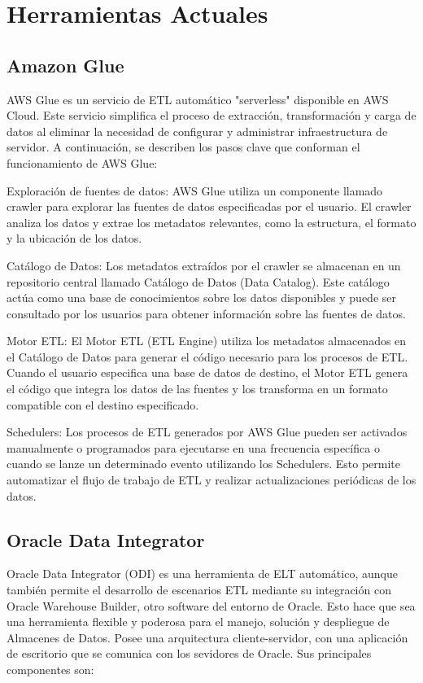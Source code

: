 \section{Herramientas Actuales} \label{section:actual_tools}

\subsection{Amazon Glue}

AWS Glue es un servicio de ETL automático "serverless" disponible en AWS Cloud. Este servicio simplifica el proceso de 
extracción, transformación y carga de datos al eliminar la necesidad de configurar y administrar infraestructura de 
servidor. A continuación, se describen los pasos clave que conforman el funcionamiento de AWS Glue:

Exploración de fuentes de datos: AWS Glue utiliza un componente llamado crawler para explorar las fuentes de datos 
especificadas por el usuario. El crawler analiza los datos y extrae los metadatos relevantes, como la estructura, el 
formato y la ubicación de los datos.

Catálogo de Datos: Los metadatos extraídos por el crawler se almacenan en un repositorio central llamado Catálogo de 
Datos (Data Catalog). Este catálogo actúa como una base de conocimientos sobre los datos disponibles y puede ser 
consultado por los usuarios para obtener información sobre las fuentes de datos.

Motor ETL: El Motor ETL (ETL Engine) utiliza los metadatos almacenados en el Catálogo de Datos para generar el código 
necesario para los procesos de ETL. Cuando el usuario especifica una base de datos de destino, el Motor ETL genera el 
código que integra los datos de las fuentes y los transforma en un formato compatible con el destino especificado.

Schedulers: Los procesos de ETL generados por AWS Glue pueden ser activados manualmente o programados para ejecutarse en 
una frecuencia específica o cuando se lanze un determinado evento utilizando los Schedulers. Esto permite automatizar el 
flujo de trabajo de ETL y realizar actualizaciones periódicas de los datos.


\subsection{Oracle Data Integrator}

Oracle Data Integrator (ODI) es una herramienta de ELT autom\'atico, aunque también permite el desarrollo de escenarios 
ETL mediante su integración con Oracle Warehouse Builder, otro software del entorno de Oracle. Esto hace que sea una 
herramienta flexible y poderosa para el manejo, soluci\'on y despliegue de Almacenes de Datos. Posee una arquitectura 
cliente-servidor, con una aplicaci\'on de escritorio que se comunica con los sevidores de Oracle. Sus principales 
componentes son: 

